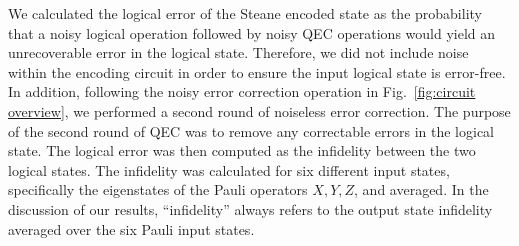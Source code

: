 \documentclass[twocolumn,pra]{revtex4}
\begin{document}
We calculated the logical error of the Steane encoded state as the probability that a noisy logical operation followed by noisy QEC operations would yield an unrecoverable error in the logical state. Therefore, we did not include noise within the encoding circuit in order to ensure the input logical state is error-free. In addition, following the noisy error correction operation in Fig.~\ref{fig:circuit overview}, we performed a second round of noiseless error correction. The purpose of the second round of QEC was to remove any correctable errors in the logical state. The logical error was then computed as the infidelity between the two logical states. The infidelity was calculated for six different input states, specifically the eigenstates of the Pauli operators $X,Y,Z$, and averaged. In the discussion of our results, ``infidelity'' always refers to the output state infidelity averaged over the six Pauli input states. 
\end{document}
